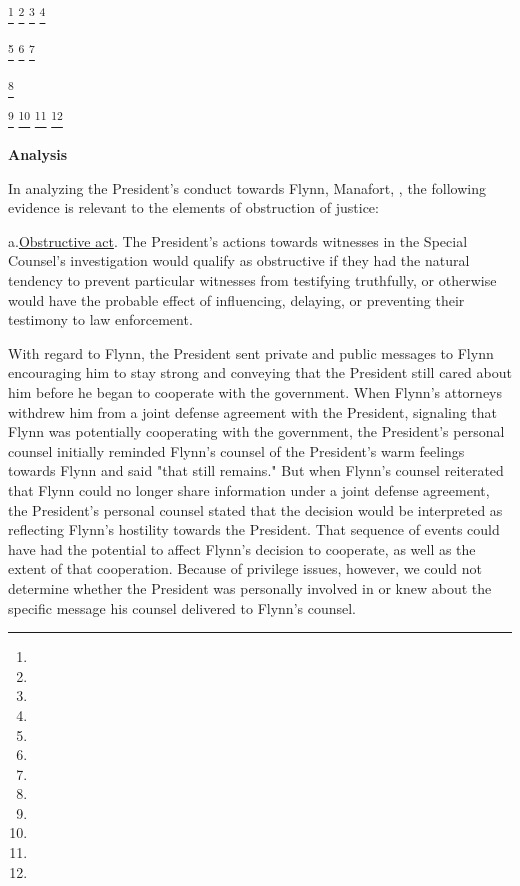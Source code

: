 
\footnote{}
\footnote{}
\footnote{}
\footnote{}

\footnote{}
\footnote{}
\footnote{}

\footnote{}

\footnote{}
\footnote{}
\footnote{}
\footnote{}

\begin{center}
\textbf{Analysis}
\end{center}

In analyzing the President's conduct towards Flynn, Manafort, , the following evidence is relevant to the elements of obstruction of justice:

a.\qquad\underline{Obstructive act}.
The President's actions towards witnesses in the Special Counsel's investigation would qualify as obstructive if they had the natural tendency to prevent particular witnesses from testifying truthfully, or otherwise would have the probable effect of influencing, delaying, or preventing their testimony to law enforcement.

With regard to Flynn, the President sent private and public messages to Flynn encouraging him to stay strong and conveying that the President still cared about him before he began to cooperate with the government.
When Flynn's attorneys withdrew him from a joint defense agreement with the President, signaling that Flynn was potentially cooperating with the government, the President's personal counsel initially reminded Flynn's counsel of the President's warm feelings towards Flynn and said "that still remains."
But when Flynn's counsel reiterated that Flynn could no longer share information under a joint defense agreement, the President's personal counsel stated that the decision would be interpreted as reflecting Flynn's hostility towards the President.
That sequence of events could have had the potential to affect Flynn's decision to cooperate, as well as the extent of that cooperation.
Because of privilege issues, however, we could not determine whether the President was personally involved in or knew about the specific message his counsel delivered to Flynn's counsel.

